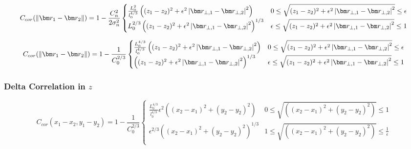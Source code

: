 \begin{equation}\label{EQ:correlation_2}
  C_{cor}(\|\vect{r}_1-\vect{r}_{2}\|) = 1 - \frac{C_n^2}{2\sigma_n^2}
    \begin{cases}
        \frac{L_0^2}{l_{0}^{4/3}} \left( (z_{1} - z_{2})^{2} + \epsilon^2 \left|\vect{r}_{\perp,1}-\vect{r}_{\perp,2}\right|^{2}\right) & 0 \leq \sqrt{(z_{1} - z_{2})^{2} + \epsilon^2 \left|\vect{r}_{\perp,1}-\vect{r}_{\perp,2}\right|^{2}}  \leq  \epsilon \\
        L_0^{2/3} \left( (z_{1} - z_{2})^{2} + \epsilon^2 \left|\vect{r}_{\perp,1}-\vect{r}_{\perp,2}\right|^{2}\right)^{1/3} &  \epsilon \leq \sqrt{(z_{1} - z_{2})^{2} + \epsilon^2 \left|\vect{r}_{\perp,1}-\vect{r}_{\perp,2}\right|^{2}}  \leq  1   \\
   \end{cases}
\end{equation}


\begin{equation}
  C_{cor}(\|\vect{r}_1-\vect{r}_{2}\|) = 1 - \frac{1}{C_0^{2/3}}
    \begin{cases}
        \frac{L_0^{4/3}}{l_{0}^{4/3}}\left( (z_{1} - z_{2})^{2} + \epsilon^2 \left|\vect{r}_{\perp,1}-\vect{r}_{\perp,2}\right|^{2}\right) & 0 \leq \sqrt{(z_{1} - z_{2})^{2} + \epsilon^2 \left|\vect{r}_{\perp,1}-\vect{r}_{\perp,2}\right|^{2}}  \leq  \epsilon  \\
        \left( (z_{1} - z_{2})^{2} + \epsilon^2 \left|\vect{r}_{\perp,1}-\vect{r}_{\perp,2}\right|^{2}\right)^{1/3} &  \epsilon \leq \sqrt{(z_{1} - z_{2})^{2} + \epsilon^2 \left|\vect{r}_{\perp,1}-\vect{r}_{\perp,2}\right|^{2}}  \leq  1 \\
   \end{cases}
\end{equation}


\subsubsection{Delta Correlation in $z$}

\begin{equation}
  C_{cor}(x_1-x_2,y_1-y_2) = 1 - \frac{1}{C_0^{2/3}}
    \begin{cases}
        \frac{L_0^{4/3}}{l_{0}^{4/3}}\epsilon^2 \left((x_2-x_1)^{2} + (y_2-y_2)^{2}\right) & 0 \leq \sqrt{\left((x_2-x_1)^{2} + (y_2-y_2)^{2}\right)} \leq  1  \\
        \epsilon^{2/3} \left((x_2-x_1)^{2} + (y_2-y_2)^{2}\right)^{1/3} & 1 \leq \sqrt{\left((x_2-x_1)^{2} + (y_2-y_2)^{2}\right)}  \leq  \frac{1}{\epsilon} \\
   \end{cases}
\end{equation}

